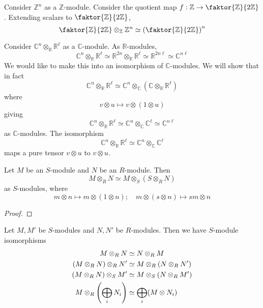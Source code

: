 \begin{example}
    Consider \( \mathbb Z^n \) as a \( \mathbb Z \)-module.
    Consider the quotient map \( f : \mathbb Z \to \faktor{\mathbb Z}{2\mathbb Z} \).
    Extending scalars to \( \faktor{\mathbb Z}{2\mathbb Z} \),
    \[ \faktor{\mathbb Z}{2\mathbb Z} \otimes_{\mathbb Z} \mathbb Z^n \simeq \qty(\faktor{\mathbb Z}{2\mathbb Z})^n \]
\end{example}
\begin{example}
    Consider \( \mathbb C^n \otimes_{\mathbb R} \mathbb R^\ell \) as a \( \mathbb C \)-module.
    As \( \mathbb R \)-modules,
    \[ \mathbb C^n \otimes_{\mathbb R} \mathbb R^\ell \simeq \mathbb R^{2n} \otimes_{\mathbb R} \mathbb R^\ell \simeq \mathbb R^{2n\ell} \simeq \mathbb C^{n\ell} \]
    We would like to make this into an isomorphism of \( \mathbb C \)-modules.
    We will show that in fact
    \[ \mathbb C^n \otimes_{\mathbb R} \mathbb R^\ell \simeq \mathbb C^n \otimes_{\mathbb C} (\mathbb C \otimes_{\mathbb R} \mathbb R^\ell) \]
    where
    \[ v \otimes u \mapsto v \otimes (1 \otimes u) \]
    giving
    \[ \mathbb C^n \otimes_{\mathbb R} \mathbb R^\ell \simeq \mathbb C^n \otimes_{\mathbb C} \mathbb C^\ell \simeq \mathbb C^{n\ell} \]
    as \( \mathbb C \)-modules.
    The isomorphism
    \[ \mathbb C^n \otimes_{\mathbb R} \mathbb R^\ell \simeq \mathbb C^n \otimes_{\mathbb C} \mathbb C^\ell \]
    maps a pure tensor \( v \otimes u \) to \( v \otimes u \).
\end{example}
\begin{proposition}
    Let \( M \) be an \( S \)-module and \( N \) be an \( R \)-module.
    Then
    \[ M \otimes_R N \simeq M \otimes_S (S \otimes_R N) \]
    as \( S \)-modules, where
    \[ m \otimes n \mapsto m \otimes (1 \otimes n);\quad m \otimes (s \otimes n) \mapsto sm \otimes n \]
\end{proposition}
\begin{proof}
\end{proof}
\begin{proposition}
    Let \( M, M' \) be \( S \)-modules and \( N, N' \) be \( R \)-modules.
    Then we have \( S \)-module isomorphisms
    \begin{align*}
        M \otimes_R N &\simeq N \otimes_R M \\
        (M \otimes_R N) \otimes_R N' &\simeq M \otimes_R (N \otimes_R N') \\
        (M \otimes_R N) \otimes_S M' &\simeq M \otimes_S (N \otimes_R M') \\
        M \otimes_R \qty(\bigoplus_i N_i) &\simeq \bigoplus_i (M \otimes N_i)
    \end{align*}
\end{proposition}
